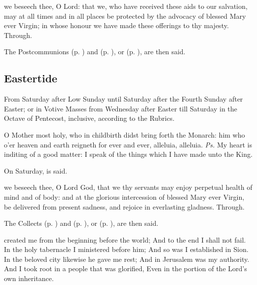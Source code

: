
\postcommunion
{} we beseech thee, O Lord: that we, who have received these aids to our salvation, may at all times and in all places be protected by the advocacy of blessed Mary ever Virgin; in whose honour we have made these offerings to thy majesty. Through.
\begin{rubric}
    The Postcommunions  (p. \pageref{SPHolyGhost}) and  (p. \pageref{SPAgainst}), or  (p. \pageref{SPChiefBishop}), are then said.
\end{rubric}


\clearpage
\subsection{Eastertide}
\begin{rubric}
    {From Saturday after Low Sunday until Saturday after the Fourth Sunday after Easter; or in Votive Masses from Wednesday after Easter till Saturday in the Octave of Pentecost, inclusive, according to the Rubrics.}
\end{rubric}

\introit
{} O Mother most holy, who in childbirth didst bring forth the Monarch: him who o'er heaven and earth reigneth for ever and ever, alleluia, alleluia. \textit{Ps.} My heart is inditing of a good matter: I speak of the things which I have made unto the King.
\begin{rubric}
    On Saturday,  is said.
\end{rubric}

\collect
{} we beseech thee, O Lord God, that we thy servants may enjoy perpetual health of mind and of body: and at the glorious intercession of blessed Mary ever Virgin, be delivered from present sadness, and rejoice in everlasting gladness. Through.
\begin{rubric}
    The Collects  (p. \pageref{SPHolyGhost}) and  (p. \pageref{SPAgainst}), or  (p. \pageref{SPChiefBishop}), are then said.
\end{rubric}

 created me from the beginning before the world; And to the end I shall not fail. In the holy tabernacle I ministered before him; And so was I established in Sion. In the beloved city likewise he gave me rest; And in Jerusalem was my authority. And I took root in a people that was glorified, Even in the portion of the Lord’s own inheritance.


